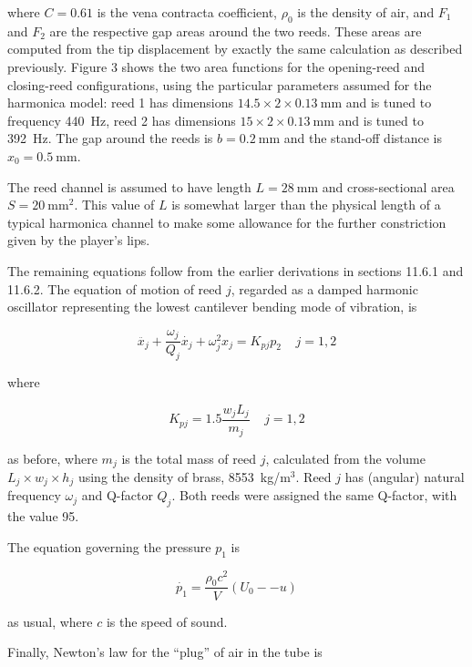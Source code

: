   where $C=0.61$ is the vena contracta coefficient, $\rho_0$ is the density of 
  air, and $F_1$ and $F_2$ are the respective gap areas around the two reeds. 
  These areas are computed from the tip displacement by exactly the same 
  calculation as described previously. Figure 3 shows the two area functions 
  for the opening-reed and closing-reed configurations, using the particular 
  parameters assumed for the harmonica model: reed 1 has dimensions $14.5 
  \times 2 \times 0.13 \mathrm{~mm}$ and is tuned to frequency 440~Hz, reed 2 
  has dimensions $15 \times 2 \times 0.13 \mathrm{~mm}$ and is tuned to 392~Hz. 
  The gap around the reeds is $b=0.2 \mathrm{~mm}$ and the stand-off distance 
  is $x_0=0.5 \mathrm{~mm}$. 


  The reed channel is assumed to have length $L=28 \mathrm{~mm}$ and 
  cross-sectional area $S=20 \mathrm{~mm}^2$. This value of $L$ is somewhat 
  larger than the physical length of a typical harmonica channel to make some 
  allowance for the further constriction given by the player's lips. 

  The remaining equations follow from the earlier derivations in sections 
  11.6.1 and 11.6.2. The equation of motion of reed $j$, regarded as a damped 
  harmonic oscillator representing the lowest cantilever bending mode of 
  vibration, is 

  $$\ddot{x_j}+\dfrac{\omega_j}{Q_j} \dot{x_j} +\omega_j^2 x_j = K_{pj} p_2 
  \mathrm{~~~~~} j=1,2 \tag{4}$$ 

  where 

  $$K_{pj} = 1.5 \dfrac{w_j L_j}{m_j} \mathrm{~~~~~} j=1,2 \tag{5}$$ 

  as before, where $m_j$ is the total mass of reed $j$, calculated from the 
  volume $L_j \times w_j \times h_j$ using the density of brass, 8553~kg/m$^3$. 
  Reed $j$ has (angular) natural frequency $\omega_j$ and Q-factor $Q_j$. Both 
  reeds were assigned the same Q-factor, with the value 95. 

  The equation governing the pressure $p_1$ is 

  $$\dot{p_1}=\dfrac{\rho_0 c^2}{V} (U_0 -- u) \tag{6}$$ 

  as usual, where $c$ is the speed of sound. 

  Finally, Newton's law for the ``plug'' of air in the tube is 

